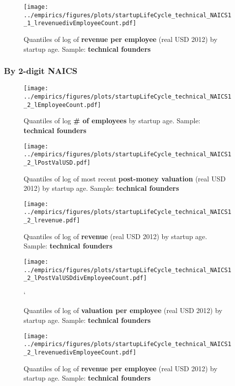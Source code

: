 \documentclass[12pt,english]{article}
\theoremstyle{remark}
\let\Oldsubsubsection\subsubsection
\renewcommand{\subsubsection}{\FloatBarrier\Oldsubsubsection}
\begin{document}
\begin{figure}[!htb]
	\centering
	\texttt{[image: ../empirics/figures/plots/startupLifeCycle\_technical\_NAICS1\_1\_lrevenuedivEmployeeCount.pdf]}
	\caption{Quantiles of log of \textbf{revenue per employee} (real USD 2012) by startup age. 
		Sample: \textbf{technical founders}}
\end{figure}

\subsubsection{By 2-digit NAICS}

\begin{figure}[!htb]
	\centering
	\texttt{[image: ../empirics/figures/plots/startupLifeCycle\_technical\_NAICS1\_2\_lEmployeeCount.pdf]}
	\caption{Quantiles of log \textbf{\# of employees} by startup age. 
		Sample: \textbf{technical founders}}
\end{figure}

\begin{figure}[!htb]
	\centering
	\texttt{[image: ../empirics/figures/plots/startupLifeCycle\_technical\_NAICS1\_2\_lPostValUSD.pdf]}
	\caption{Quantiles of log of most recent \textbf{post-money valuation} (real USD 2012) by startup age. 
		Sample: \textbf{technical founders}}
\end{figure}

\begin{figure}[!htb]
	\centering
	\texttt{[image: ../empirics/figures/plots/startupLifeCycle\_technical\_NAICS1\_2\_lrevenue.pdf]}
	\caption{Quantiles of log of \textbf{revenue} (real USD 2012) by startup age. 
		Sample: \textbf{technical founders}}
\end{figure}

\begin{figure}[!htb]
	\centering
	\texttt{[image: ../empirics/figures/plots/startupLifeCycle\_technical\_NAICS1\_2\_lPostValUSDdivEmployeeCount.pdf]}
	\caption{Quantiles of log of \textbf{valuation per employee} (real USD 2012) by startup age. 
		Sample: \textbf{technical founders}}`
\end{figure}

\begin{figure}[!htb]
	\centering
	\texttt{[image: ../empirics/figures/plots/startupLifeCycle\_technical\_NAICS1\_2\_lrevenuedivEmployeeCount.pdf]}
	\caption{Quantiles of log of \textbf{revenue per employee} (real USD 2012) by startup age. 
		Sample: \textbf{technical founders}}
\end{figure}
\end{document}
